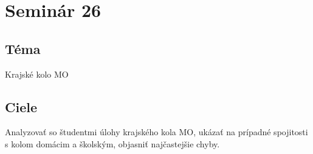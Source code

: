 \section*{Seminár 26}


\subsection*{Téma}
Krajské kolo MO

\subsection{Ciele}
Analyzovať so študentmi úlohy krajského kola MO, ukázať na prípadné spojitosti s kolom domácim a školským, objasniť najčastejšie chyby.

